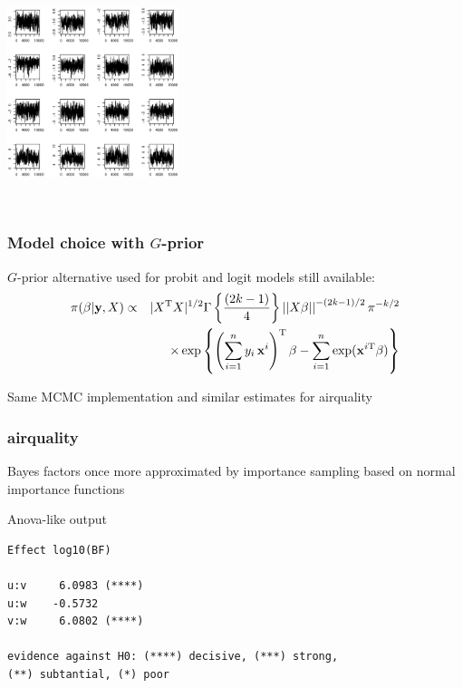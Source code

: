 \begin{slide}
\begin{columns}
\includegraphics[width=5cm,height=6cm]{figures/trajflatloglin.eps}
\end{columns}

\end{slide}
\begin{frame}
\frametitle{Model choice with $G$-prior}

$G$-prior alternative used for probit and logit models still available:
\begin{eqnarray*}
\pi(\beta|\mathbf{y},X) & \propto & |X^{\mathrm{T}} X|^{1/2}\Gamma\left\{\frac{(2k-1)}{4}\right\}
\left|\left|X\beta\right|\right|^{-(2k-1)/2}\pi^{-k/2} \nonumber \\
&& \quad\times\exp\left\{ \left(\sum_{i=1}^n y_i\,\mathbf{x}^i\right)^{\mathrm{T}} \beta -
\sum_{i=1}^n \exp (\mathbf{x}^{i\mathrm{T}}\beta) \right\}
\end{eqnarray*}

\vs\pause
Same MCMC implementation and similar estimates for {\sf airquality}

\end{frame}
\begin{frame}[fragile]
\frametitle{{\sf airquality}}

Bayes factors once more approximated by importance sampling based on normal
importance functions

\vs\pause
\begin{block}{Anova-like output}
\begin{verbatim}
Effect log10(BF)

u:v     6.0983 (****)
u:w    -0.5732
v:w     6.0802 (****)

evidence against H0: (****) decisive, (***) strong,
(**) subtantial, (*) poor
\end{verbatim}
\end{block}

\end{frame}
